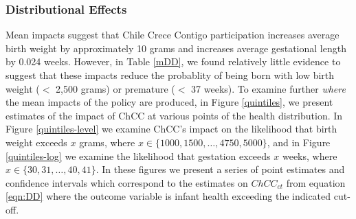 \documentclass[12pt]{article}
\begin{document}
\begin{spacing}{1.4}
\subsubsection{Distributional Effects}
Mean impacts suggest that Chile Crece Contigo participation increases
average birth weight by approximately 10 grams and increases average
gestational length by 0.024 weeks.  However, in Table \ref{mDD}, we
found relatively little evidence to suggest that these impacts reduce the
probablity of being born with low birth weight ($<$ 2,500 grams) or
premature ($<$ 37 weeks).  To examine further \emph{where} the mean
impacts of the policy are produced, in Figure \ref{quintiles}, we present estimates
of the impact of ChCC at various points of the health distribution.
In Figure \ref{quintiles-level} we examine ChCC's impact on the
likelihood that birth weight exceeds $x$ grams, where
$x\in\{1000,1500,\ldots,4750,5000\}$, and in Figure \ref{quintiles-log}
we examine the likelihood that gestation exceeds $x$ weeks, where
$x\in\{30,31,\ldots,40,41\}$.  In these figures we present a series
of point estimates and confidence intervals which correspond to the
estimates on $ChCC_{ct}$ from equation \ref{eqn:DD} where the outcome
variable is infant health exceeding the indicated cut-off.



\end{spacing}
\end{document}

